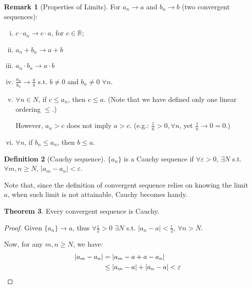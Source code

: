 \documentclass[12pt]{article}
\newcommand{\R}{{\mathbb R}}
\theoremstyle{definition}
\newtheorem{theorem}{Theorem}[section]
\newtheorem{definition}[theorem]{Definition}
\newtheorem{remark}[theorem]{Remark}
\theoremstyle{plain}
\begin{document}
\begin{remark}
    [Properties of Limits]
    For $a_n \to a$ and $b_n \to b$ (two convergent sequences):
    \begin{enumerate}[(i)]
        \item $c \cdot a_n \to c\cdot a$, for $c \in \R$;
        \item $a_n + b_n \to a + b$
        \item $a_n \cdot b_n \to a\cdot b$
        \item $\frac{a_n}{b_n} \to \frac{a}{b}$ s.t. $b \not = 0$ and $b_n \not=
            0$ $\forall n$.
        \item $\forall n \in N$, if  $c \le a_n$, then $c \le a$. (Note that we have
            defined only one linear ordering $\le$.)

            However, $a_n > c$ does not imply $a > c$. (e.g.:
            $\frac{1}{n} > 0, \forall n$, yet $\frac{1}{n}\to 0 = 0$.)

        \item $\forall n$, if $b_n \le a_n$, then $b\le a$.
    \end{enumerate}
\end{remark}

\begin{definition}
    [Cauchy sequence]

    $\{a_n\}$ is a Cauchy sequence if $\forall \varepsilon> 0$, $\exists N$ s.t.
    $\forall m , n \ge N$, $|a_m-a_n| < \varepsilon$.
\end{definition}

Note that, since the definition of convergent sequence relies on knowing the
limit $a$, when such limit is not attainable, Cauchy becomes handy.

\begin{theorem}
    \label{thm_convergent_is_Cauchy}
    Every convergent sequence is Cauchy.
    \begin{proof}
        Given $\{a _n\} \to a$, thus $\forall \frac{\varepsilon}{2} >
        0$ $\exists N$ s.t. $|a_n - a| < \frac{\varepsilon}{2}$, $\forall n >
        N$.

        Now, for any $m, n \ge N$, we have:
        \[
            \aligned
            |a_m - a_n| & = | a_m - a + a - a_n|\\
            & \le |a_m - a| + |a_n - a| < \varepsilon
            \endaligned
        \]
    \end{proof}
\end{theorem}
\end{document}
